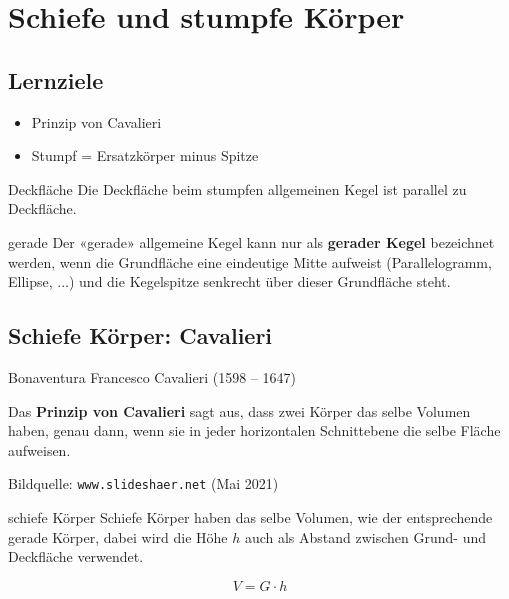 \section{Schiefe und stumpfe Körper}


\subsection*{Lernziele}
\begin{itemize}
\item Prinzip von Cavalieri
\item Stumpf = Ersatzkörper minus Spitze
\end{itemize}


\begin{bemerkung}{Deckfläche}{}
Die Deckfläche beim stumpfen allgemeinen Kegel ist parallel zu Deckfläche.
\end{bemerkung}

\begin{bemerkung}{gerade}{}
  Der «gerade» allgemeine Kegel kann nur als \textbf{gerader Kegel} bezeichnet werden, wenn die Grundfläche eine eindeutige Mitte aufweist (Parallelogramm, Ellipse, ...) und die Kegelspitze senkrecht über dieser Grundfläche steht.
\end{bemerkung}
  \newpage


\subsection{Schiefe Körper: Cavalieri}
Bonaventura Francesco Cavalieri (1598 – 1647)

Das \textbf{Prinzip von Cavalieri} sagt aus, dass zwei Körper das
selbe Volumen haben, genau dann, wenn sie in jeder horizontalen
Schnittebene die selbe Fläche aufweisen.

Bildquelle: \texttt{www.slideshaer.net} (Mai 2021)
\vspace{9mm}

\begin{gesetz}{schiefe Körper}{}
  Schiefe Körper haben das selbe Volumen, wie der entsprechende gerade Körper, dabei wird die Höhe $h$ auch als Abstand zwischen Grund- und Deckfläche verwendet.

  $$V = G\cdot{} h$$
\end{gesetz}

